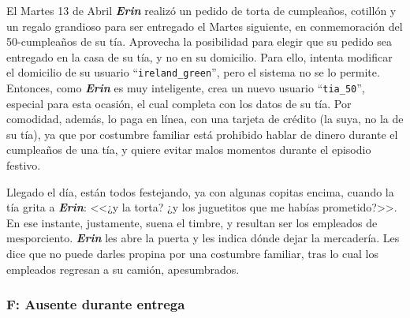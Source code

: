 El Martes 13 de Abril \textbf{\emph{Erin}} realizó un pedido de torta de
cumpleaños, cotillón y un regalo grandioso para ser entregado el Martes
siguiente, en conmemoración del 50-cumpleaños de su tía. Aprovecha la
posibilidad para elegir que su pedido sea entregado en la casa de su tía, y no
en su domicilio. Para ello, intenta modificar el domicilio de su usuario
``\texttt{ireland\_green}'', pero el sistema no se lo permite. Entonces, como
\textbf{\emph{Erin}} es muy inteligente, crea un nuevo usuario
``\texttt{tia\_50}'', especial para esta ocasión, el cual completa con los datos
de su tía. Por comodidad, además, lo paga en línea, con una tarjeta de crédito
(la suya, no la de su tía), ya que por costumbre familiar está prohibido hablar
de dinero durante el cumpleaños de una tía, y quiere evitar malos momentos
durante el episodio festivo.

Llegado el día, están todos festejando, ya con algunas copitas encima, cuando la
tía grita a \textbf{\emph{Erin}}: <<¿y la torta? ¿y los juguetitos que me habías
prometido?>>. En ese instante, justamente, suena el timbre, y resultan ser los
empleados de mesporciento. \textbf{\emph{Erin}} les abre la puerta y les indica
dónde dejar la mercadería. Les dice que no puede darles propina por una
costumbre familiar, tras lo cual los empleados regresan a su camión,
apesumbrados.

\subsubsection{F: Ausente durante entrega}

